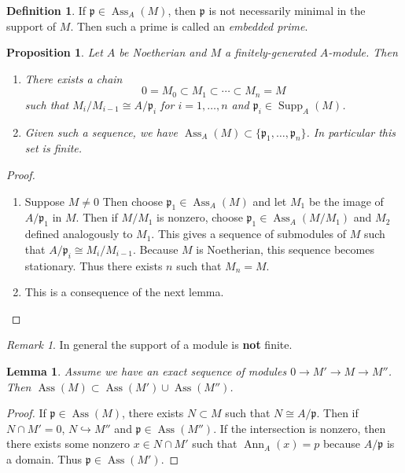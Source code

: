 \documentclass[leqno, openany]{memoir}
\newtheorem{prop}[thm]{Proposition}
\newtheorem{lem}[thm]{Lemma}
\theoremstyle{definition}
\newtheorem{defn}[thm]{Definition}
\theoremstyle{remark}
\newtheorem{rmk}[thm]{Remark}
\theoremstyle{plain}
\theoremstyle{definition}
\theoremstyle{remark}
\newcommand{\mf}[1]{\mathfrak{#1}}
\DeclareMathOperator{\Supp}{Supp}
\DeclareMathOperator{\Ann}{Ann}
\DeclareMathOperator{\Ass}{Ass}
\begin{document}
\begin{defn}
    If $\mf{p} \in \Ass_A(M)$, then $\mf{p}$ is not necessarily minimal in the support of $M$. Then such a prime is called an \textit{embedded prime}. 
\end{defn}

\begin{prop}
    Let $A$ be Noetherian and $M$ a finitely-generated $A$-module. Then
    \begin{enumerate}
        \item There exists a chain
            \[ 0 = M_0 \subset M_1 \subset \cdots \subset M_n = M \]
            such that $M_i / M_{i-1} \cong A / \mf{p}_i$ for $i = 1, \ldots, n$ and $\mf{p}_i \in \Supp_A(M)$.
        \item Given such a sequence, we have $\Ass_A(M) \subset \{ \mf{p}_1, \ldots, \mf{p}_n \}$. In particular this set is finite.
    \end{enumerate}
\end{prop}

\begin{proof}
    \begin{enumerate}
        \item Suppose $M \neq 0$ Then choose $\mf{p}_1 \in \Ass_A(M)$ and let $M_1$ be the image of $A / \mf{p}_1$ in $M$. Then if $M / M_1$ is nonzero, choose $\mf{p}_1 \in \Ass_A(M / M_1)$ and $M_2$ defined analogously to $M_1$. This gives a sequence of submodules of $M$ such that $A / \mf{p}_i \cong M_i / M_{i-1}$. Because $M$ is Noetherian, this sequence becomes stationary. Thus there exists $n$ such that $M_n = M$.
        \item This is a consequence of the next lemma.
    \end{enumerate}
\end{proof}

\begin{rmk}
    In general the support of a module is \textbf{not} finite. 
\end{rmk}

\begin{lem}
    Assume we have an exact sequence of modules $0 \to M' \to M \to M''$. Then $\Ass(M) \subset \Ass(M') \cup \Ass(M'')$.
\end{lem}

\begin{proof}
    If $\mf{p} \in \Ass(M)$, there exists $N \subset M$ such that $N \cong A / \mf{p}$. Then if $N \cap M' = 0$, $N \hookrightarrow M''$ and $\mf{p} \in \Ass(M'')$. If the intersection is nonzero, then there exists some nonzero $x \in N \cap M'$ such that $\Ann_A(x) = p$ because $A/\mf{p}$ is a domain. Thus $\mf{p} \in \Ass(M')$.
\end{proof}
\end{document}
